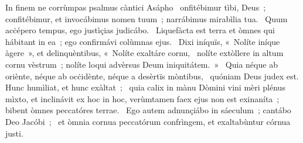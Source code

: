 { In finem ne corrùmpas psalmus càntici Asápho}
{%
~onfitébimur tìbi, Deus~; confitébimur, et invocábimus nomen tuum~; narrábimus mirabìlia tua. 
~Quum acċépero tempus, ego justìçias judicábo. 
~Liquefàcta est terra et òmnes qui hábitant in ea~; ego confirmávi colùmnas ejus. 
~Dixi iníquïs, «~Nolíte iníque àgere~», et delinquèntibus, «~Nolíte exaltáre cornu, 
~nolíte extòllere in altum cornu vèstrum~; nolíte loqui advèrsus Deum iniquitátem.~»
~Quia néque ab oriènte, néque ab ocċidènte, néque a desèrtïs mòntibus, 
~quóniam Deus judex est. Hunc humìliat, et hunc exàltat~; 
~quia calix in mànu Dòmini vini mèri plénus mìxto, et inclinávit ex hoc in hoc, verùmtamen faex ejus non est exinaníta~; bibent òmnes peccatóres terrae. 
~Ego autem adnunçiábo in sáeculum~; cantábo Deo Jacóbi~; 
~et òmnia cornua peccatórum confrìngem, et exaltabùntur córnua justi. 
}
